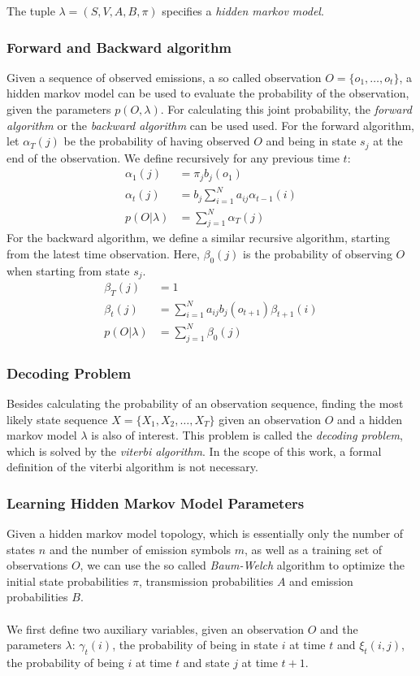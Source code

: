 The tuple $\lambda = (S, V, A, B, \pi)$ specifies a \textit{hidden markov model}. 
\subsubsection{Forward and Backward algorithm}
Given a sequence of observed emissions, a so called observation $O = \{o_1, \dots, o_t\}$, a hidden markov model can be used to evaluate the probability of the observation, given the parameters $p(O, \lambda)$. For calculating this joint probability, the \textit{forward algorithm} or the \textit{backward algorithm} can be used used. For the forward algorithm, let $\alpha_T(j)$ be the probability of having observed $O$ and being in state $s_j$ at the end of the observation. We define recursively for any previous time $t$:
\begin{align*}
\alpha_1(j) &= \pi_j b_j(o_1) \\
\alpha_t(j) &= b_j \sum_{i = 1}^{N} a_{ij}\alpha_{t-1}(i) \\
p(O|\lambda) &= \sum_{j = 1}^{N} \alpha_T(j)
\end{align*}
For the backward algorithm, we define a similar recursive algorithm, starting from the latest time observation. Here, $\beta_0(j)$ is the probability of observing $O$ when starting from state $s_j$.
\begin{align*}
\beta_T(j) &= 1 \\
\beta_t(j) &= \sum_{i = 1}^{N} a_{ij}b_j(o_{t+1}) \beta_{t+1}(i) \\
p(O|\lambda) &= \sum_{j = 1}^{N} \beta_0(j)
\end{align*}
\subsubsection{Decoding Problem}
Besides calculating the probability of an observation sequence, finding the most likely state sequence $X = \{X_1, X_2, \dots, X_T\}$ given an observation $O$ and a hidden markov model $\lambda$ is also of interest. 
This problem is called the \textit{decoding problem}, which is solved by the \textit{viterbi algorithm}. In the scope of this work, a formal definition of the viterbi algorithm is not necessary. 

\subsubsection{Learning Hidden Markov Model Parameters}
Given a hidden markov model topology, which is essentially only the number of states $n$ and the number of emission symbols $m$, as well as a training set of observations $O$, we can use the so called \textit{Baum-Welch} algorithm to optimize the initial state probabilities $\pi$, transmission probabilities $A$ and emission probabilities $B$. \\ \\
We first define two auxiliary variables, given an observation $O$ and the parameters $\lambda$: $\gamma_t(i)$, the probability of being in state $i$ at time $t$ and $\xi_t(i, j)$, the probability of being $i$ at time $t$ and state $j$ at time $t + 1$.

